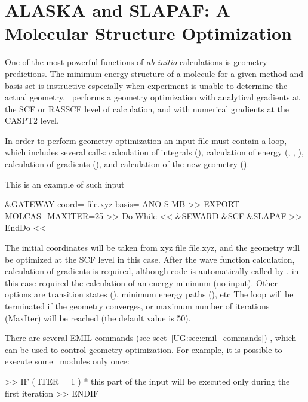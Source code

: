 \section{ALASKA and SLAPAF: A Molecular Structure Optimization}
\label{TUT:sec:structure}

One of the most powerful functions of {\it ab initio} calculations is geometry 
predictions.  The minimum energy structure of a molecule for a given method and 
basis set is instructive especially when experiment is unable to determine the 
actual geometry. \molcas\ performs a geometry optimization with analytical 
gradients at the SCF or RASSCF level of calculation, and with numerical 
gradients at the CASPT2 level.

In order to perform geometry optimization an input file must contain
a loop, which includes several calls: calculation of integrals (),
calculation of energy (, , ), calculation of gradients
(), and calculation of the new geometry (). 

This is an example of such input
\begin{sourcelisting}
  &GATEWAY
   coord= file.xyz
   basis= ANO-S-MB
>> EXPORT MOLCAS_MAXITER=25
>> Do While  <<
  &SEWARD
  &SCF  
  &SLAPAF
>> EndDo << 
\end{sourcelisting}

The initial coordinates will be taken from xyz file file.xyz, and the geometry 
will be optimized at the SCF level in this case. After the wave function calculation,
calculation of gradients is required, although code  is automatically
called by \molcas.  in this case required the calculation of an
energy minimum (no input). Other options are transition states (), minimum energy
paths (), etc
The loop will be terminated if the geometry 
converges, or maximum number of iterations (MaxIter) will be reached (the
default value is 50).

There are several EMIL commands 
\ifmanual
(see sect~\ref{UG:sec:emil_commands})
\fi
, which can be 
used to control geometry optimization. For example, it is possible to execute 
some \molcas\ modules only once:
\begin{sourcelisting}
>> IF ( ITER = 1 )
* this part of the input will be executed only during the first iteration
>> ENDIF
\end{sourcelisting}

